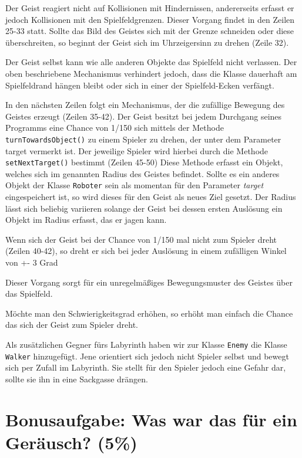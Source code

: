 \documentclass{pi1}
\begin{document}
Der Geist reagiert nicht auf Kollisionen mit Hindernissen, andererseits erfasst er jedoch Kollisionen mit den Spielfeldgrenzen. Dieser Vorgang findet in den Zeilen 25-33 statt. Sollte das Bild des Geistes sich mit der Grenze schneiden oder diese überschreiten, so beginnt der Geist sich im Uhrzeigersinn zu drehen (Zeile 32).

Der Geist selbst kann wie alle anderen Objekte das Spielfeld nicht verlassen. Der oben beschriebene Mechanismus verhindert jedoch, dass die Klasse dauerhaft am Spielfeldrand hängen bleibt oder sich in einer der Spielfeld-Ecken verfängt. 

In den nächsten Zeilen folgt ein Mechanismus, der die zufällige Bewegung des Geistes erzeugt (Zeilen 35-42).
Der Geist besitzt bei jedem Durchgang seines Programms eine Chance von 1/150 sich mittels der Methode  \texttt{turnTowardsObject()} zu einem Spieler zu drehen, der unter dem Parameter target vermerkt ist.\newline
Der jeweilige Spieler wird hierbei durch die Methode  \texttt{setNextTarget()} bestimmt (Zeilen 45-50)\newline
Diese Methode erfasst ein Objekt, welches sich im genannten Radius des Geistes befindet. Sollte es ein anderes Objekt der Klasse  \texttt{Roboter} sein als momentan für den Parameter  \emph{target} eingespeichert ist, so wird dieses für den Geist als neues Ziel gesetzt.\newline
Der Radius lässt sich beliebig variieren solange der Geist bei dessen ersten Auslösung ein Objekt im Radius erfasst, das er jagen kann.

Wenn sich der Geist bei der Chance von 1/150 mal nicht zum Spieler dreht (Zeilen 40-42), so dreht er sich bei jeder Auslösung in einem zufälligen Winkel von +- 3 Grad

Dieser Vorgang sorgt für ein unregelmäßiges Bewegungsmuster des Geistes über das Spielfeld.

Möchte man den Schwierigkeitsgrad erhöhen, so erhöht man einfach die Chance das sich der Geist zum Spieler dreht.

Als zusätzlichen Gegner fürs Labyrinth haben wir zur Klasse  \texttt{Enemy} die Klasse  \texttt{Walker} hinzugefügt. Jene orientiert sich jedoch nicht Spieler selbst und bewegt sich per Zufall im Labyrinth.
Sie stellt für den Spieler jedoch eine Gefahr dar, sollte sie ihn in eine Sackgasse drängen.

\section{Bonusaufgabe: Was war das für ein Geräusch? (5\%)}
\end{document}
